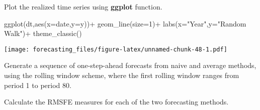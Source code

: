 \documentclass[
  oneside]{book}
\newenvironment{Shaded}{\begin{snugshade}}{\end{snugshade}}
\newcommand{\AttributeTok}[1]{\textcolor[rgb]{0.77,0.63,0.00}{#1}}
\newcommand{\ConstantTok}[1]{\textcolor[rgb]{0.00,0.00,0.00}{#1}}
\newcommand{\ControlFlowTok}[1]{\textcolor[rgb]{0.13,0.29,0.53}{\textbf{#1}}}
\newcommand{\DecValTok}[1]{\textcolor[rgb]{0.00,0.00,0.81}{#1}}
\newcommand{\FunctionTok}[1]{\textcolor[rgb]{0.00,0.00,0.00}{#1}}
\newcommand{\NormalTok}[1]{#1}
\newcommand{\OtherTok}[1]{\textcolor[rgb]{0.56,0.35,0.01}{#1}}
\newcommand{\SpecialCharTok}[1]{\textcolor[rgb]{0.00,0.00,0.00}{#1}}
\newcommand{\StringTok}[1]{\textcolor[rgb]{0.31,0.60,0.02}{#1}}
\begin{document}
Plot the realized time series using \textbf{ggplot} function.

\begin{Shaded}
\begin{Highlighting}[]
\FunctionTok{ggplot}\NormalTok{(dt,}\FunctionTok{aes}\NormalTok{(}\AttributeTok{x=}\NormalTok{date,}\AttributeTok{y=}\NormalTok{y))}\SpecialCharTok{+}
  \FunctionTok{geom\_line}\NormalTok{(}\AttributeTok{size=}\DecValTok{1}\NormalTok{)}\SpecialCharTok{+}
  \FunctionTok{labs}\NormalTok{(}\AttributeTok{x=}\StringTok{"Year"}\NormalTok{,}\AttributeTok{y=}\StringTok{"Random Walk"}\NormalTok{)}\SpecialCharTok{+}
  \FunctionTok{theme\_classic}\NormalTok{()}
\end{Highlighting}
\end{Shaded}

\texttt{[image: forecasting\_files/figure-latex/unnamed-chunk-48-1.pdf]}

Generate a sequence of one-step-ahead forecasts from naive and average methods, using the rolling window scheme, where the first rolling window ranges from period 1 to period 80.

\begin{Shaded}
\end{Shaded}

Calculate the RMSFE measures for each of the two forecasting methods.
\end{document}
